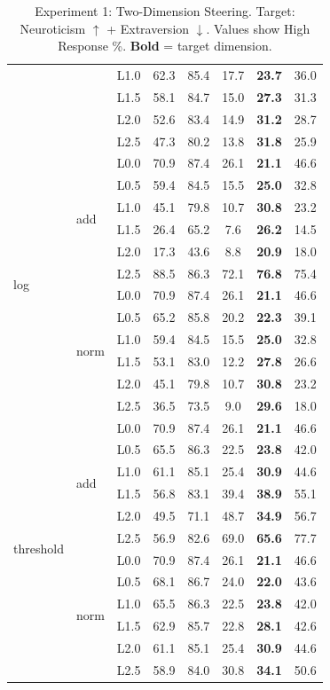 \begin{table}[htbp]
\begin{tabular}{lllccccc}
 &  & L1.0 & 62.3 & 85.4 & 17.7 & \textbf{23.7} & 36.0 \\
 &  & L1.5 & 58.1 & 84.7 & 15.0 & \textbf{27.3} & 31.3 \\
 &  & L2.0 & 52.6 & 83.4 & 14.9 & \textbf{31.2} & 28.7 \\
 &  & L2.5 & 47.3 & 80.2 & 13.8 & \textbf{31.8} & 25.9 \\
\midrule
\multirow{12}{*}{log} & \multirow{6}{*}{add} & L0.0 & 70.9 & 87.4 & 26.1 & \textbf{21.1} & 46.6 \\
 &  & L0.5 & 59.4 & 84.5 & 15.5 & \textbf{25.0} & 32.8 \\
 &  & L1.0 & 45.1 & 79.8 & 10.7 & \textbf{30.8} & 23.2 \\
 &  & L1.5 & 26.4 & 65.2 & 7.6 & \textbf{26.2} & 14.5 \\
 &  & L2.0 & 17.3 & 43.6 & 8.8 & \textbf{20.9} & 18.0 \\
 &  & L2.5 & 88.5 & 86.3 & 72.1 & \textbf{76.8} & 75.4 \\
\cmidrule{2-8}
 & \multirow{6}{*}{norm} & L0.0 & 70.9 & 87.4 & 26.1 & \textbf{21.1} & 46.6 \\
 &  & L0.5 & 65.2 & 85.8 & 20.2 & \textbf{22.3} & 39.1 \\
 &  & L1.0 & 59.4 & 84.5 & 15.5 & \textbf{25.0} & 32.8 \\
 &  & L1.5 & 53.1 & 83.0 & 12.2 & \textbf{27.8} & 26.6 \\
 &  & L2.0 & 45.1 & 79.8 & 10.7 & \textbf{30.8} & 23.2 \\
 &  & L2.5 & 36.5 & 73.5 & 9.0 & \textbf{29.6} & 18.0 \\
\midrule
\multirow{12}{*}{threshold} & \multirow{6}{*}{add} & L0.0 & 70.9 & 87.4 & 26.1 & \textbf{21.1} & 46.6 \\
 &  & L0.5 & 65.5 & 86.3 & 22.5 & \textbf{23.8} & 42.0 \\
 &  & L1.0 & 61.1 & 85.1 & 25.4 & \textbf{30.9} & 44.6 \\
 &  & L1.5 & 56.8 & 83.1 & 39.4 & \textbf{38.9} & 55.1 \\
 &  & L2.0 & 49.5 & 71.1 & 48.7 & \textbf{34.9} & 56.7 \\
 &  & L2.5 & 56.9 & 82.6 & 69.0 & \textbf{65.6} & 77.7 \\
\cmidrule{2-8}
 & \multirow{6}{*}{norm} & L0.0 & 70.9 & 87.4 & 26.1 & \textbf{21.1} & 46.6 \\
 &  & L0.5 & 68.1 & 86.7 & 24.0 & \textbf{22.0} & 43.6 \\
 &  & L1.0 & 65.5 & 86.3 & 22.5 & \textbf{23.8} & 42.0 \\
 &  & L1.5 & 62.9 & 85.7 & 22.8 & \textbf{28.1} & 42.6 \\
 &  & L2.0 & 61.1 & 85.1 & 25.4 & \textbf{30.9} & 44.6 \\
 &  & L2.5 & 58.9 & 84.0 & 30.8 & \textbf{34.1} & 50.6 \\
\bottomrule
\end{tabular}
\caption{Experiment 1: Two-Dimension Steering. Target: Neuroticism $\uparrow$ + Extraversion $\downarrow$. Values show High Response \%. \textbf{Bold} = target dimension.}
\label{tab:exp1}
\end{table}